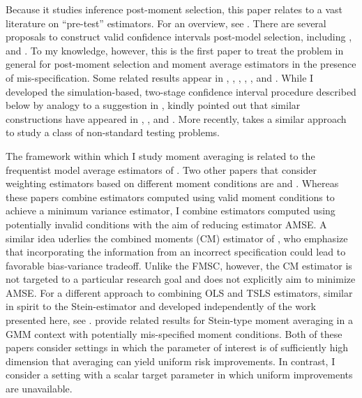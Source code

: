 Because it studies inference post-moment selection, this paper relates to a vast literature on ``pre-test'' estimators.
For an overview, see \citet{LeebPoetscher2005, LeebPoetscher2009}.
There are several proposals to construct valid confidence intervals post-model selection, including \cite{Kabaila1998}, \cite{HjortClaeskens} and \cite{KabailaLeeb2006}. 
To my knowledge, however, this is the first paper to treat the problem in general for post-moment selection and moment average estimators in the presence of mis-specification.
Some related results appear in \cite{Berkowitz2008}, \cite{Berkowitz2012}, \cite{Guggenberger2010}, \cite{Guggenberger2012}, \cite{GuggenbergerKumar}, and \cite{Caner2014}.
While I developed the simulation-based, two-stage confidence interval procedure described below by analogy to a suggestion in \cite{ClaeskensHjortbook}, \cite{Leeb} kindly pointed out that similar constructions have appeared in \cite{Loh1985}, \cite{Berger1994}, and \cite{Silvapulle1996}. More recently, \cite{McCloskey} takes a similar approach to study a class of non-standard testing problems.

The framework within which I study moment averaging is related to the frequentist model average estimators of \cite{HjortClaeskens}.
Two other papers that consider weighting estimators based on different moment conditions are \cite{Xiao} and \cite{ChenChavezLinton}.
Whereas these papers combine estimators computed using valid moment conditions to achieve a minimum variance estimator, I combine estimators computed using potentially invalid conditions with the aim of reducing estimator AMSE.
A similar idea uderlies the combined moments (CM) estimator of \cite{Judge2007}, who emphasize that incorporating the information from an incorrect specification could lead to favorable bias-variance tradeoff. 
Unlike the FMSC, however, the CM estimator is not targeted to a particular research goal and does not explicitly aim to minimize AMSE.
For a different approach to combining OLS and TSLS estimators, similar in spirit to the Stein-estimator and developed independently of the work presented here, see \cite{Hansen2014}. 
\cite{ChengLiaoShi} provide related results for Stein-type moment averaging in a GMM context with potentially mis-specified moment conditions.
Both of these papers consider settings in which the parameter of interest is of sufficiently high dimension that averaging can yield uniform risk improvements.
In contrast, I consider a setting with a scalar target parameter in which uniform improvements are unavailable.


